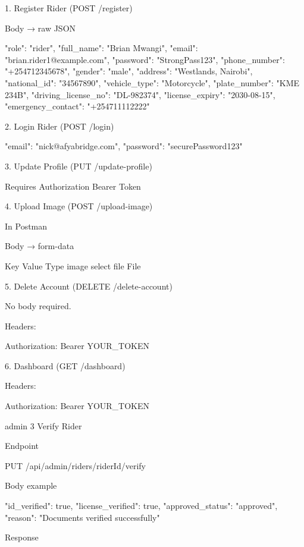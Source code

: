 1. Register Rider (POST /register)

Body → raw JSON

{
  "role": "rider",
  "full_name": "Brian Mwangi",
  "email": "brian.rider1@example.com",
  "password": "StrongPass123",
  "phone_number": "+254712345678",
  "gender": "male",
  "address": "Westlands, Nairobi",
  "national_id": "34567890",
  "vehicle_type": "Motorcycle",
  "plate_number": "KME 234B",
  "driving_license_no": "DL-982374",
  "license_expiry": "2030-08-15",
  "emergency_contact": "+254711112222"
}


2. Login Rider (POST /login)

{
  "email": "nick@afyabridge.com",
  "password": "securePassword123"
}


3. Update Profile (PUT /update-profile)

Requires Authorization Bearer Token


4. Upload Image (POST /upload-image)

In Postman

Body → form-data

Key	Value	Type
image	select file	File



5. Delete Account (DELETE /delete-account)

No body required.

Headers:

Authorization: Bearer YOUR_TOKEN


6. Dashboard (GET /dashboard)

Headers:

Authorization: Bearer YOUR_TOKEN



admin 
3 Verify Rider

Endpoint

PUT /api/admin/riders/{riderId}/verify

Body example

{
  "id_verified": true,
  "license_verified": true,
  "approved_status": "approved",
  "reason": "Documents verified successfully"
}

Response